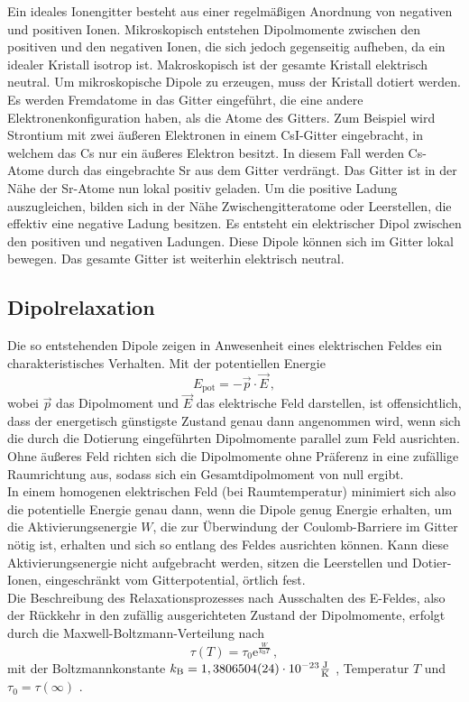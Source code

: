 Ein ideales Ionengitter besteht aus einer regelmäßigen Anordnung von negativen und positiven Ionen.
Mikroskopisch entstehen Dipolmomente zwischen den positiven und den negativen Ionen, die sich jedoch gegenseitig aufheben,
da ein idealer Kristall isotrop ist.
Makroskopisch ist der gesamte Kristall elektrisch neutral.
Um mikroskopische Dipole zu erzeugen, muss der Kristall dotiert werden.
Es werden Fremdatome in das Gitter eingeführt, die eine andere Elektronenkonfiguration haben, als die Atome des Gitters.
Zum Beispiel wird Strontium mit zwei äußeren Elektronen in einem CsI-Gitter eingebracht, in welchem das Cs nur ein äußeres Elektron besitzt.
In diesem Fall werden Cs-Atome durch das eingebrachte Sr aus dem Gitter verdrängt.
Das Gitter ist in der Nähe der Sr-Atome nun lokal positiv geladen.
Um die positive Ladung auszugleichen, bilden sich in der Nähe Zwischengitteratome oder Leerstellen,
die effektiv eine negative Ladung besitzen.
Es entsteht ein elektrischer Dipol zwischen den positiven und negativen Ladungen.
Diese Dipole können sich im Gitter lokal bewegen.
Das gesamte Gitter ist weiterhin elektrisch neutral.

\subsection{Dipolrelaxation}

Die so entstehenden Dipole zeigen in Anwesenheit eines elektrischen Feldes ein charakteristisches Verhalten.
Mit der potentiellen Energie
\begin{equation}
    E_\text{pot} = - \vec{p} \cdot \vec{E} \,,
    \label{eq:potE}
\end{equation}
wobei $\vec{p}$ das Dipolmoment und $\vec{E}$ das elektrische Feld darstellen, ist offensichtlich, dass der energetisch günstigste Zustand genau dann angenommen wird, 
wenn sich die durch die Dotierung eingeführten Dipolmomente parallel zum Feld ausrichten. \\

Ohne äußeres Feld richten sich die Dipolmomente ohne Präferenz in eine zufällige Raumrichtung aus, sodass sich ein Gesamtdipolmoment von null ergibt. \\
In einem homogenen elektrischen Feld (bei Raumtemperatur) minimiert sich also die potentielle Energie genau dann, wenn die Dipole genug Energie erhalten, um die Aktivierungsenergie $W$, 
die zur Überwindung der Coulomb-Barriere im Gitter nötig ist, erhalten und sich so entlang des Feldes ausrichten können.
Kann diese Aktivierungsenergie nicht aufgebracht werden, sitzen die Leerstellen und Dotier-Ionen, eingeschränkt vom Gitterpotential, örtlich fest. \\
Die Beschreibung des Relaxationsprozesses nach Ausschalten des E-Feldes, also der Rückkehr in den zufällig ausgerichteten Zustand der Dipolmomente, erfolgt durch die Maxwell-Boltzmann-Verteilung nach
\begin{equation}
    \tau(T) = \tau_0 \text{e}^{\frac{W}{k_\text{B} T}}  \,,
    \label{eq:relaxationszeit}
\end{equation}
mit der Boltzmannkonstante $k_\text{B} = 1,380 6504(24) \cdot 10^{-23} \si{\frac{\joule}{\kelvin}} $ \cite{pdg}, Temperatur $T$ und $\tau_0 = \tau(\infty)$ \cite{v48}.

